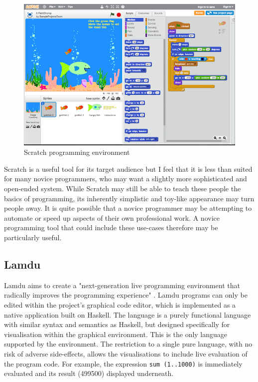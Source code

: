 \begin{figure}[H]
\centering
\includegraphics[scale=0.5]{graphics/scratch-editor} %
\caption{Scratch programming environment}
\label{fig:scratch} %
\end{figure}

Scratch is a useful tool for its target audience but I feel that it is less than suited for many novice programmers, who may want a slightly more sophisticated and open-ended system. While Scratch may still be able to teach these people the basics of programming, its inherently simplistic and toy-like appearance may turn people away. It is quite possible that a novice programmer may be attempting to automate or speed up aspects of their own professional work. A novice programming tool that could include these use-cases therefore may be particularly useful.

\subsection{Lamdu}

Lamdu aims to create a "next-generation live programming environment that radically improves the programming experience" \cite{lamdu}. Lamdu programs can only be edited within the project's graphical code editor, which is implemented as a native application built on Haskell. The language is a purely functional language with similar syntax and semantics as Haskell, but designed specifically for visualisation within the graphical environment. This is the only language supported by the environment. The restriction to a single pure language, with no risk of adverse side-effects, allows the visualisations to include live evaluation of the program code. For example, the expression \verb+sum (1..1000)+ is immediately evaluated and its result (499500) displayed underneath.

